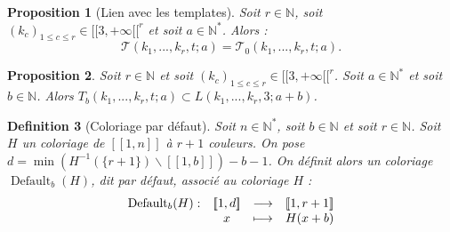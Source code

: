 \documentclass{article}
\newtheorem{definition}{Definition}[section]
\newtheorem{proposition}[definition]{Proposition}
\DeclareMathOperator{\coldef}{Default}
\begin{document}
\begin{proposition}[Lien avec les templates]
Soit \(r \in \mathbb{N}\), soit \((k_c)_{1 \leqslant c \leqslant r} \in {[\![3, +\infty[\![}^r\) et soit \(a \in \mathbb{N}^*\). Alors :
\[ \mathcal{T}(k_1, ..., k_r, t; a) = \mathcal{T}_0(k_1, ..., k_r, t; a). \]
\end{proposition}

\begin{proposition}
Soit \(r \in \mathbb{N}\) et soit \((k_c)_{1 \leqslant c \leqslant r} \in {[\![3, +\infty[\![}^r\). Soit \(a \in \mathbb{N}^*\) et soit \(b \in \mathbb{N}\). Alors  \(T_b(k_1, ..., k_r, t; a) \subset L(k_1, ..., k_r, 3; a + b)\).
\end{proposition}

\begin{definition}[Coloriage par défaut]
Soit \(n \in \mathbb{N}^*\), soit \(b \in \mathbb{N}\) et soit \(r \in \mathbb{N}\). Soit \(H\) un coloriage de \([\![1, n]\!]\) à \(r +1\) couleurs. On pose \(d = \min \left(H^{-1}(\{r + 1\}) \backslash [\![1, b]\!] \right) - b  - 1\). On définit alors un coloriage \(\coldef_b(H)\), dit par défaut, associé au coloriage \(H\) :
\[\begin{array}{c c c c}
	\coldef_b(H) : & [\![1, d]\!] & \longrightarrow & [\![1, r + 1]\!] \\
	 & x & \longmapsto & H(x + b)
\end{array}\]
\end{definition}
\end{document}
